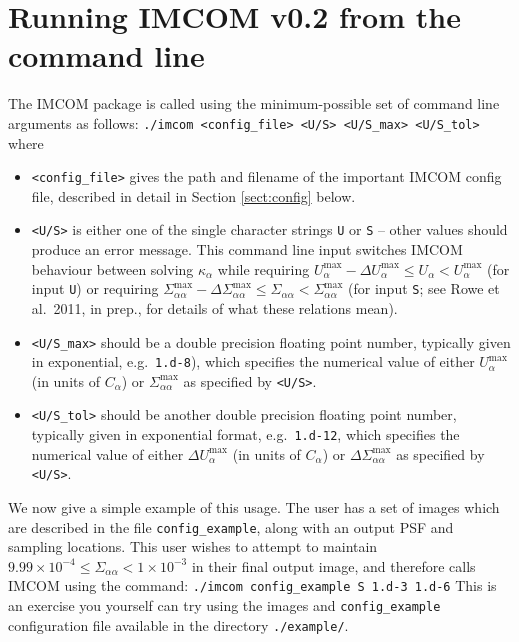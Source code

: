 \documentclass[10pt]{article}
\begin{document}
\section{Running IMCOM v0.2 from the command line}
The IMCOM package is called using the minimum-possible set of command line arguments as follows:
\newline
\newline
\indent \texttt{./imcom <config\_file> <U/S> <U/S\_max> <U/S\_tol>}
\newline
\newline
where
\begin{itemize}
\item \texttt{<config\_file>} gives the path and filename of the important IMCOM config file, described in detail in Section \ref{sect:config} below.

\item \texttt{<U/S>} is either one of the single character strings \texttt{U} or \texttt{S} -- other values should produce an error message.  This command line input switches IMCOM behaviour between solving $\kappa_{\alpha}$ while requiring $U_{\alpha}^{\textrm{max}} - \Delta U_{\alpha}^{\textrm{max}} \le U_{\alpha} < U_{\alpha}^{\textrm{max}}$ (for input \texttt{U}) or requiring $ \Sigma_{\alpha \alpha}^{\textrm{max}} - \Delta \Sigma_{\alpha \alpha}^{\textrm{max}} \le \Sigma_{\alpha \alpha} < \Sigma_{\alpha \alpha}^{\textrm{max}}$ (for input \texttt{S}; see Rowe et al.\ 2011, in prep., for details of what these relations mean).

\item \texttt{<U/S\_max>} should be a double precision floating point number, typically given in exponential, e.g.\ \texttt{1.d-8}), which specifies the numerical value of either $U_{\alpha}^{\textrm{max}}$ (in units of $C_{\alpha}$) or $\Sigma_{\alpha \alpha}^{\textrm{max}}$ as specified by \texttt{<U/S>}.

\item \texttt{<U/S\_tol>} should be another double precision floating point number, typically given in exponential format, e.g.\ \texttt{1.d-12}, which specifies the numerical value of either $\Delta U_{\alpha}^{\textrm{max}}$ (in units of $C_{\alpha}$) or $\Delta \Sigma_{\alpha \alpha}^{\textrm{max}}$ as specified by \texttt{<U/S>}.
\end{itemize}

We now give a simple example of this usage. The user has a set of images which are described in the file \texttt{config\_example}, along with an output PSF and sampling locations.  This user wishes to attempt to maintain $9.99 \times 10^{-4} \le \Sigma_{\alpha \alpha} < 1 \times 10^{-3}$ in their final output image, and therefore calls IMCOM using the command:
\newline
\newline
\texttt{./imcom config\_example S 1.d-3 1.d-6}
\newline
\newline
This is an exercise you yourself can try using the images and \texttt{config\_example} configuration file available in the directory \texttt{./example/}.
\end{document}
